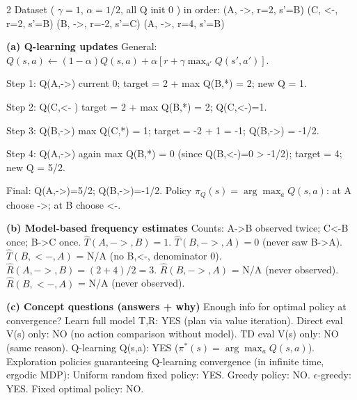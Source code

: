 \documentclass[10pt]{article}
\begin{document}
\begin{multicols*}{2}
Dataset ( $\gamma=1$, $\alpha=1/2$, all Q init 0 ) in order:\newline
(A, ->, r=2, s'=B)\newline
(C, <-, r=2, s'=B)\newline
(B, ->, r=-2, s'=C)\newline
(A, ->, r=4, s'=B)

\textbf{(a) Q-learning updates}\newline
General: $Q(s,a) \leftarrow (1-\alpha)Q(s,a) + \alpha [ r + \gamma \max_{a'} Q(s',a') ]$.

Step 1: Q(A,->)\newline
current 0; target = 2 + max Q(B,*) = 2; new Q = 1.

Step 2: Q(C,<- )\newline
target = 2 + max Q(B,*) = 2; Q(C,<-)=1.

Step 3: Q(B,->)\newline
max Q(C,*) = 1; target = -2 + 1 = -1; Q(B,->) = -1/2.

Step 4: Q(A,->) again\newline
max Q(B,*) = 0 (since Q(B,<-)=0 > -1/2); target = 4; new Q = 5/2.

Final: Q(A,->)=5/2; Q(B,->)=-1/2.\newline
Policy $\pi_Q(s)=\arg\max_a Q(s,a)$: at A choose ->; at B choose <-.

\textbf{(b) Model-based frequency estimates}\newline
Counts: A->B observed twice; C<-B once; B->C once.\newline
$\hat{T}(A,->,B)=1$.\newline
$\hat{T}(B,->,A)=0$ (never saw B->A).\newline
$\hat{T}(B,<-,A)$ = N/A (no B,<-, denominator 0).\newline
$\hat{R}(A,->,B)= (2+4)/2 = 3$.\newline
$\hat{R}(B,->,A)$ = N/A (never observed).\newline
$\hat{R}(B,<-,A)$ = N/A (never observed).

\textbf{(c) Concept questions (answers + why)}\newline
Enough info for optimal policy at convergence?\newline
Learn full model T,R: YES (plan via value iteration).\newline
Direct eval V(s) only: NO (no action comparison without model).\newline
TD eval V(s) only: NO (same reason).\newline
Q-learning Q(s,a): YES ($\pi^*(s)=\arg\max_a Q(s,a)$).\newline
Exploration policies guaranteeing Q-learning convergence (in infinite time, ergodic MDP):\newline
Uniform random fixed policy: YES.\newline
Greedy policy: NO.\newline
$\epsilon$-greedy: YES.\newline
Fixed optimal policy: NO.


\end{multicols*}
\end{document}
